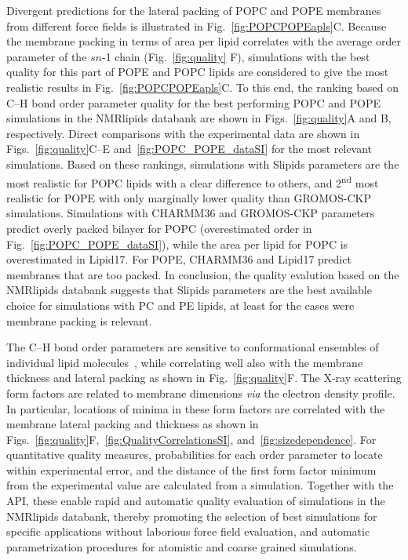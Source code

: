 \documentclass[fleqn,10pt]{wlscirep}
\begin{document}
Divergent predictions for the lateral packing of POPC and POPE membranes from different force fields is illustrated in Fig.~\ref{fig:POPCPOPEapls}C. Because the membrane packing in terms of area per lipid correlates with the average order parameter of the $\textit{sn}$-1 chain (Fig.~\ref{fig:quality} F), simulations with the best quality for this part of POPE and POPC lipids are considered to give the most realistic results in Fig.~\ref{fig:POPCPOPEapls}C. To this end, the ranking based on C--H bond order parameter quality for the best performing POPC and POPE simulations in the NMRlipids databank are shown in Figs.~\ref{fig:quality}A and B, respectively. Direct comparisons with the experimental data are shown in Figs.~\ref{fig:quality}C--E and~\ref{fig:POPC_POPE_dataSI} for the most relevant simulations. Based on these rankings, simulations with Slipids parameters are the most realistic for POPC lipids with a clear difference to others, and 2\textsuperscript{nd} most realistic for POPE with only marginally lower quality than GROMOS-CKP simulations. Simulations with CHARMM36 and GROMOS-CKP parameters predict overly packed bilayer for POPC (overestimated order in Fig.~\ref{fig:POPC_POPE_dataSI}), while the area per lipid for POPC is overestimated in Lipid17. For POPE, CHARMM36 and Lipid17 predict membranes that are too packed. In conclusion, the quality evalution based on the NMRlipids databank suggests that Slipids parameters are the best available choice for simulations with PC and PE lipids, at least for the cases were membrane packing is relevant.


The C--H bond order parameters are sensitive to conformational ensembles of individual lipid molecules~\cite{ollila16}, while correlating well also with the membrane thickness and lateral packing as shown in Fig.~\ref{fig:quality}F. The X-ray scattering form factors are related to membrane dimensions \textit{via} the electron density profile. In particular, locations of minima in these form factors are correlated with the membrane lateral packing and thickness as shown in Figs.~\ref{fig:quality}F,~\ref{fig:QualityCorrelationsSI}, and~\ref{fig:sizedependence}. For quantitative quality measures, probabilities for each order parameter to locate within experimental error, and the distance of the first form factor minimum from the experimental value are calculated from a simulation.
Together with the API, these enable rapid and automatic quality evaluation of simulations in the NMRlipids databank, thereby promoting the selection of best simulations for specific applications without laborious force field evaluation, and automatic parametrization procedures for atomistic and coarse grained simulations.
\end{document}

